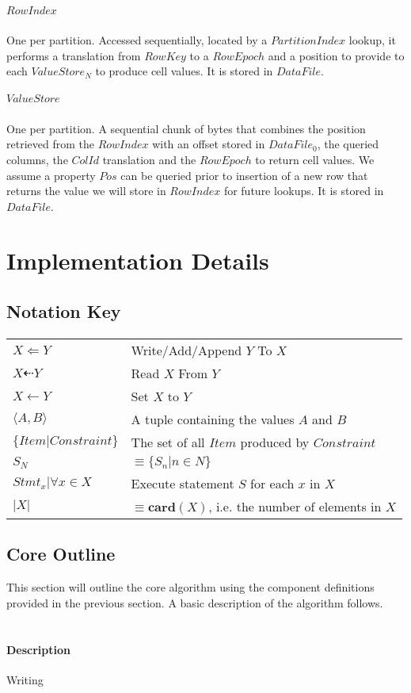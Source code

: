 \documentclass[fleqn]{article}
\begin{document}
\subparagraph{$RowIndex$}
\subparagraph{}
    One per partition. Accessed sequentially, located by a $PartitionIndex$ lookup, it performs 
    a translation from $RowKey$ to a $RowEpoch$ and a position to provide to each $ValueStore_N$
    to produce cell values. It is stored in $DataFile$.
    \\

\subparagraph{$ValueStore$}
\subparagraph{}
    One per partition. A sequential chunk of bytes that combines the position retrieved
    from the $RowIndex$ with an offset stored in $DataFile_0$, the queried columns, the $ColId$ translation
    and the $RowEpoch$ to return cell values. We assume a property $Pos$ can be queried prior to insertion
    of a new row that returns the value we will store in $RowIndex$ for future lookups. It is stored in $DataFile$.
    \\


\section{Implementation Details}
\subsection{Notation Key}
\paragraph{}
\begin{tabular}{l l}
$X \Leftarrow Y$ & Write/Add/Append $Y$ To $X$\\
$X \dashleftarrow Y$ & Read $X$ From $Y$\\
$X \gets Y$ & Set $X$ to $Y$\\
$\langle A,B \rangle$ & A tuple containing the values $A$ and $B$\\
$\{Item | Constraint\}$ & The set of all $Item$ produced by $Constraint$\\
$S_N$ & $\equiv \{S_n | n \in N\}$\\
$Stmt_x | \forall x \in X$ & Execute statement $S$ for each $x$ in $X$\\
$\lvert X \rvert$ & $\equiv \mathbf{card}(X)$, i.e. the number of elements in $X$\\
\end{tabular}

\subsection{Core Outline}
\small
This section will outline the core algorithm using the component definitions provided in the previous
section. A basic description of the algorithm follows.
\\\\
\paragraph{Description}

\begin{algorithm}[H]
\scriptsize
\caption{Writing}
%
%
\end{algorithm}
\end{document}
